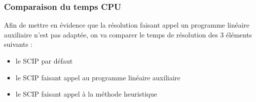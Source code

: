 \documentclass[12pt]{report}
\begin{document}
\subsubsection{Comparaison du temps CPU}
Afin de mettre en évidence que la résolution faisant appel un programme linéaire auxiliaire n'est pas adaptée, on va comparer le temps de résolution des 3 éléments suivants :
\begin{itemize}
    \item le SCIP par défaut
    \item le SCIP faisant appel au programme linéaire auxiliaire 
    \item le SCIP faisant appel à la méthode heuristique
\end{itemize}




\end{document}
